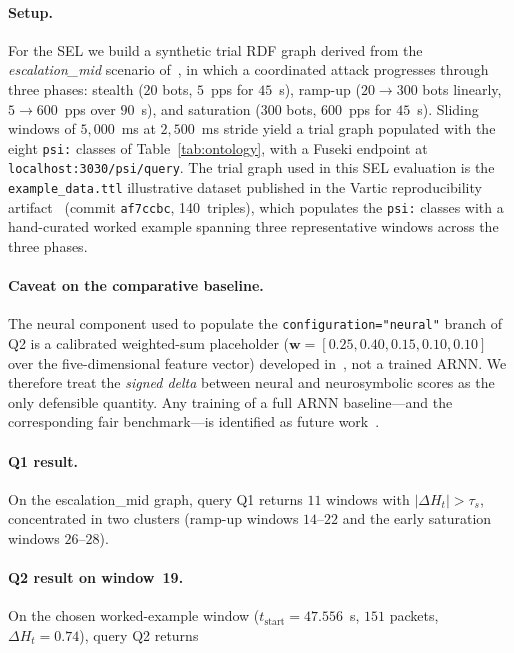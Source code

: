 \documentclass[futureinternet,article,submit,pdftex,moreauthors]{Definitions/mdpi}
\newcommand{\EntropyDeviation}{\ensuremath{\Delta H}}
\newcommand{\taus}{\ensuremath{\tau_{s}}}
\begin{document}
\paragraph{Setup.} For the SEL we build a synthetic trial RDF graph
derived from the \emph{escalation\_mid} scenario of~\cite{vartic2026},
in which a coordinated attack progresses through three phases: stealth
($20$ bots, $5$~pps for $45$~s), ramp-up ($20\to300$ bots linearly,
$5\to600$~pps over $90$~s), and saturation ($300$ bots, $600$~pps for
$45$~s). Sliding windows of $5{,}000$~ms at $2{,}500$~ms stride yield a
trial graph populated with the eight \texttt{psi:} classes of
Table~\ref{tab:ontology}, with a Fuseki endpoint at
\verb|localhost:3030/psi/query|.
The trial graph used in this SEL evaluation is the
\texttt{example\_data.ttl} illustrative dataset published in the
Vartic reproducibility artifact~\cite{vartic2026}
(commit \texttt{af7ccbc}, 140~triples), which populates the
\texttt{psi:} classes with a hand-curated worked example spanning
three representative windows across the three phases.

\paragraph{Caveat on the comparative baseline.} The neural component
used to populate the \texttt{configuration="neural"} branch of Q2 is a
calibrated weighted-sum placeholder
($\mathbf{w} = [0.25, 0.40, 0.15, 0.10, 0.10]$ over the
five-dimensional feature vector) developed in~\cite{vartic2026}, not
a trained ARNN. We therefore treat the \emph{signed delta} between
neural and neurosymbolic scores as the only defensible quantity. Any
training of a full ARNN baseline---and the corresponding fair
benchmark---is identified as future work~\cite{paper5}.

\paragraph{Q1 result.} On the escalation\_mid graph, query Q1 returns
$11$ windows with $|\EntropyDeviation_t| > \taus$, concentrated in two clusters
(ramp-up windows $14$--$22$ and the early saturation windows $26$--$28$).

\paragraph{Q2 result on window~19.} On the chosen worked-example window
($t_{\mathrm{start}} = 47.556$~s, $151$ packets, $\EntropyDeviation_t = 0.74$), query
Q2 returns
\end{document}
